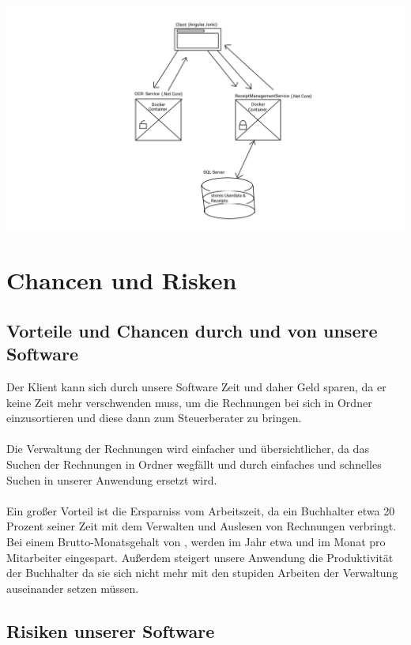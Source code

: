 \documentclass[12pt]{article}
\theoremstyle{definition}
\begin{document}
\includegraphics[width=\linewidth,trim=130mm 10mm 100mm 10mm, clip]{SystemConcept}
\pagebreak


\section{Chancen und Risken}

\subsection{Vorteile und Chancen durch und von unsere Software}

Der Klient kann sich durch unsere Software Zeit und daher Geld sparen, da er keine Zeit mehr verschwenden muss, um die Rechnungen bei sich in Ordner einzusortieren und diese dann zum Steuerberater zu bringen.\\ \\
Die Verwaltung der Rechnungen wird einfacher und übersichtlicher, da das Suchen der Rechnungen in Ordner wegfällt und durch einfaches und schnelles Suchen in unserer Anwendung ersetzt wird.\\ \\
Ein großer Vorteil ist die Ersparniss vom Arbeitszeit, da ein Buchhalter etwa 20 Prozent seiner Zeit mit dem Verwalten und Auslesen von Rechnungen verbringt. Bei einem Brutto-Monatsgehalt von , werden im Jahr etwa  und im Monat  pro Mitarbeiter eingespart. Außerdem steigert unsere Anwendung die Produktivität der Buchhalter da sie sich nicht mehr mit den stupiden Arbeiten der Verwaltung auseinander setzen müssen.\\



\subsection{Risiken unserer Software}
\end{document}
